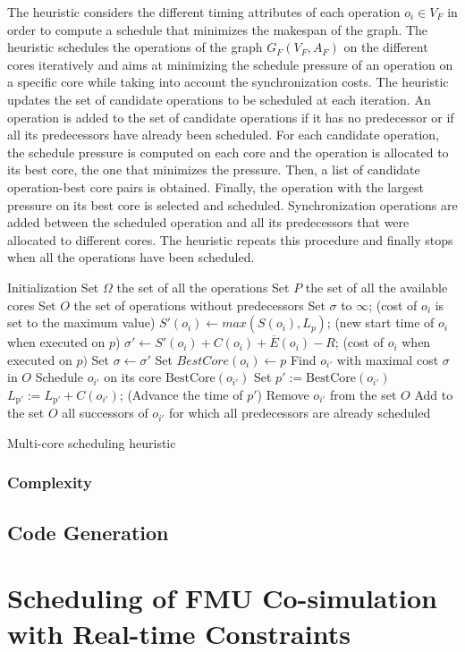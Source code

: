 The heuristic considers the different timing attributes of each operation $o_i \in V_F$ in order to compute a schedule that minimizes the makespan of the graph. The heuristic schedules the operations of the graph $G_F(V_F,A_F)$ on the different cores iteratively and aims at minimizing the schedule pressure of an operation on a specific core while taking into account the synchronization costs. %
The heuristic updates the set of candidate operations to be scheduled at each iteration. An operation is added to the set of candidate operations if it has no predecessor or if all its predecessors have already been scheduled. For each candidate operation, the schedule pressure is computed on each core and the operation is allocated to its best core, the one that minimizes the pressure. Then, a list of candidate operation-best core pairs is obtained. Finally, the operation with the largest pressure on its best core is selected and scheduled. Synchronization operations are added between the scheduled operation and all its predecessors that were allocated to different cores. The heuristic repeats this procedure and finally stops when all the operations have been scheduled.   

\begin{algorithm}[!htp]		
	  Initialization\;
		Set $\Omega$ the set of all the operations\;  
		Set $P$ the set of all the available cores\; 
 		Set $O$ the set of operations without predecessors\;  		
		{
			{
 				Set $\sigma$ to $\infty$; (cost of $o_i$ is set to the maximum value)\;
				{
  				$S'(o_i) \leftarrow max(S(o_i) , L_p)$; (new start time of $o_i$ when executed on $p$)\;
  				$\sigma' \leftarrow S'(o_i) + C(o_i) + \overline{E}(o_i) - R$; (cost of $o_i$ when executed on $p)$\;
					{
  					Set $\sigma \leftarrow \sigma'$\;
  					Set $BestCore(o_i) \leftarrow p$\;
  				}
  			}
  		 }
  		 Find $o_{i'}$ with maximal cost $\sigma$ in $O$\; 
  		 Schedule $o_{i'}$ on its core $\mathrm{BestCore}(o_{i'})$\;
  		 Set $p' := \mathrm{BestCore}(o_{i'})$\;
  		 $L_{\mathrm{p'}} := L_{\mathrm{p'}} + C(o_{i'})$; (Advance the time of $p'$)\;
  		 Remove $o_{i'}$ from the set $O$\;
  		 Add to the set $O$ all successors of $o_{i'}$ for which all predecessors are already scheduled\;
		}
	\caption{Multi-core scheduling heuristic}
	\label{algo:sched}
\end{algorithm}

\subsubsection{Complexity}

\subsection{Code Generation}

\section{Scheduling of FMU Co-simulation with Real-time Constraints}


